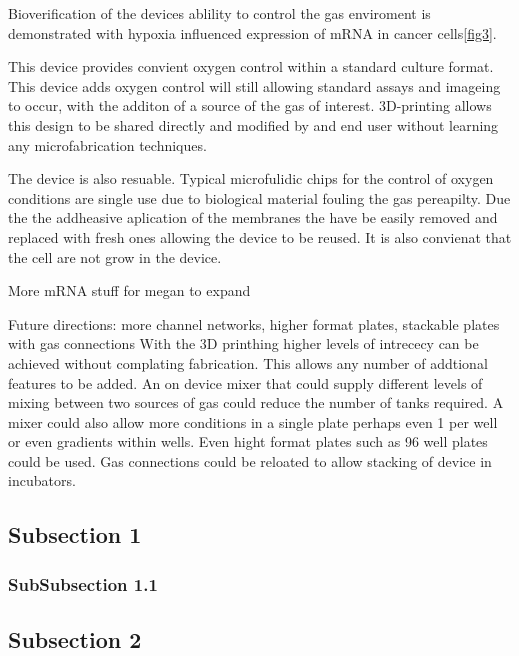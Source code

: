 Bioverification of the devices ablility to control the gas enviroment is demonstrated with hypoxia influenced expression of mRNA in cancer cells\ref{fig3}.

This device provides convient oxygen control within a standard culture format.
This device adds oxygen control will still allowing standard assays and imageing to occur, with the additon of a source of the gas of interest.
3D-printing allows this design to be shared directly and modified by and end user without learning any microfabrication techniques.

The device is also resuable. Typical microfulidic chips for the control of oxygen conditions are single use due to biological material fouling the gas pereapilty. 
Due the the addheasive aplication of the membranes the have be easily removed and replaced with fresh ones allowing the device to be reused. 
It is also convienat that the cell are not grow in the device.

More mRNA stuff for megan to expand

Future directions: more channel networks, higher format plates, stackable plates with gas connections
With the 3D printhing higher levels of intrececy can be achieved without complating fabrication.
This allows any number of addtional features to be added.
An on device mixer that could supply different levels of mixing between two sources of gas could reduce the number of tanks required.
A mixer could also allow more conditions in a single plate perhaps even 1 per well or even gradients within wells.
Even hight format plates such as 96 well plates could be used.
Gas connections could be reloated to allow stacking of device in incubators.

\subsection*{Subsection 1}

\subsubsection*{SubSubsection 1.1}

\subsection*{Subsection 2}

